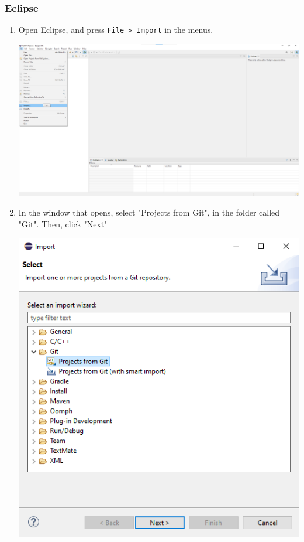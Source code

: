 \documentclass[11pt]{article}
\begin{document}
\subsubsection{Eclipse}
\label{sec:org06e14fd}
\begin{enumerate}
\item Open Eclipse, and press \texttt{File > Import} in the menus.
\begin{center}
\includegraphics[width=.9\linewidth]{../Screenshots/eclipse-install-1.png}
\end{center}
\item In the window that opens, select "Projects from Git", in the folder called "Git".  Then, click "Next"
\begin{center}
\includegraphics[width=.9\linewidth]{../Screenshots/eclipse-install-2.png}

\end{center}
\end{enumerate}
\end{document}
